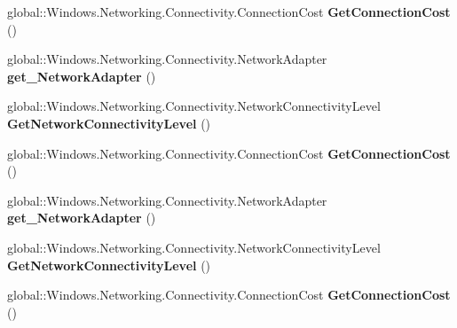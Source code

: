 \begin{DoxyCompactItemize}
global\+::\+Windows.\+Networking.\+Connectivity.\+Connection\+Cost {\bfseries Get\+Connection\+Cost} ()
\item 
\mbox{\label{interface_windows_1_1_networking_1_1_connectivity_1_1_i_connection_profile_a7ff1cc52f1dd6c6f6110d0e5fe5f29df}} 
global\+::\+Windows.\+Networking.\+Connectivity.\+Network\+Adapter {\bfseries get\+\_\+\+Network\+Adapter} ()
\item 
\mbox{\label{interface_windows_1_1_networking_1_1_connectivity_1_1_i_connection_profile_a8419d8432ed57c0bd7560b426edf602f}} 
global\+::\+Windows.\+Networking.\+Connectivity.\+Network\+Connectivity\+Level {\bfseries Get\+Network\+Connectivity\+Level} ()
\item 
\mbox{\label{interface_windows_1_1_networking_1_1_connectivity_1_1_i_connection_profile_a17f76f7b6e209095ea713f00343d03cb}} 
global\+::\+Windows.\+Networking.\+Connectivity.\+Connection\+Cost {\bfseries Get\+Connection\+Cost} ()
\item 
\mbox{\label{interface_windows_1_1_networking_1_1_connectivity_1_1_i_connection_profile_a7ff1cc52f1dd6c6f6110d0e5fe5f29df}} 
global\+::\+Windows.\+Networking.\+Connectivity.\+Network\+Adapter {\bfseries get\+\_\+\+Network\+Adapter} ()
\item 
\mbox{\label{interface_windows_1_1_networking_1_1_connectivity_1_1_i_connection_profile_a8419d8432ed57c0bd7560b426edf602f}} 
global\+::\+Windows.\+Networking.\+Connectivity.\+Network\+Connectivity\+Level {\bfseries Get\+Network\+Connectivity\+Level} ()
\item 
\mbox{\label{interface_windows_1_1_networking_1_1_connectivity_1_1_i_connection_profile_a17f76f7b6e209095ea713f00343d03cb}} 
global\+::\+Windows.\+Networking.\+Connectivity.\+Connection\+Cost {\bfseries Get\+Connection\+Cost} ()
\item 
\mbox{\label{interface_windows_1_1_networking_1_1_connectivity_1_1_i_connection_profile_a7ff1cc52f1dd6c6f6110d0e5fe5f29df}} 

\end{DoxyCompactItemize}
